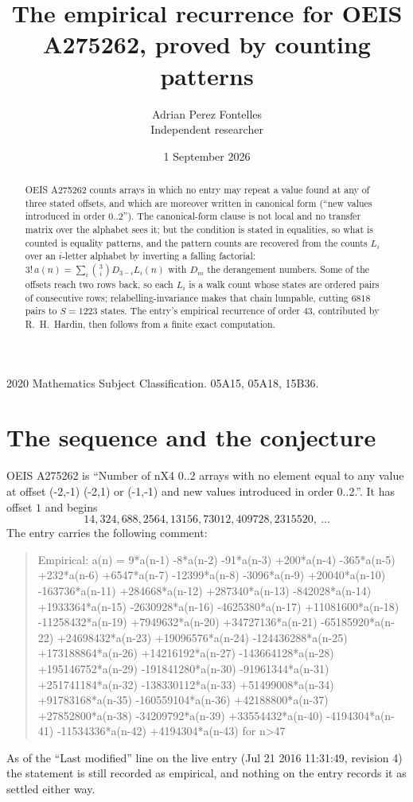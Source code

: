 \documentclass[11pt,a4paper]{article}
\title{The empirical recurrence for OEIS A275262, proved by counting patterns}
\author{Adrian Perez Fontelles\\ \small Independent researcher}
\date{1 September 2026}
\theoremstyle{plain}
\theoremstyle{definition}
\begin{document}
\maketitle

\begin{abstract}
OEIS A275262 counts arrays in which no entry may repeat a value found at any of three stated
offsets, and which are moreover written in canonical form (``new values introduced in order
$0..2$''). The canonical-form clause is not local and no transfer matrix over the
alphabet sees it; but the condition is stated in equalities, so what is counted is equality
patterns, and the pattern counts are recovered from the counts $L_i$ over an $i$-letter
alphabet by inverting a falling factorial:
$3!\,a(n)=\sum_i\binom{3}{i}D_{3-i}L_i(n)$ with $D_m$ the derangement numbers.
Some of the offsets reach two rows back, so each $L_i$ is a walk count whose states are
ordered pairs of consecutive rows; relabelling-invariance makes that chain lumpable,
cutting $6818$ pairs to $S=1223$ states. The entry's empirical recurrence of order $43$,
contributed by R.~H.~Hardin, then follows from a finite exact computation.
\end{abstract}

\noindent\small 2020 Mathematics Subject Classification. 05A15, 05A18, 15B36.\normalsize

\section{The sequence and the conjecture}

OEIS A275262 is ``Number of nX4 0..2 arrays with no element equal to any value at offset (-2,-1) (-2,1) or (-1,-1) and new values introduced in order 0..2.''. It has offset $1$ and begins
\[
14, 324, 688, 2564, 13156, 73012, 409728, 2315520,\ \dots
\]
The entry carries the following comment:
\begin{quote}\small
Empirical: a(n) = 9*a(n-1) -8*a(n-2) -91*a(n-3) +200*a(n-4) -365*a(n-5) +232*a(n-6) +6547*a(n-7) -12399*a(n-8) -3096*a(n-9) +20040*a(n-10) -163736*a(n-11) +284668*a(n-12) +287340*a(n-13) -842028*a(n-14) +1933364*a(n-15) -2630928*a(n-16) -4625380*a(n-17) +11081600*a(n-18) -11258432*a(n-19) +7949632*a(n-20) +34727136*a(n-21) -65185920*a(n-22) +24698432*a(n-23) +19096576*a(n-24) -124436288*a(n-25) +173188864*a(n-26) +14216192*a(n-27) -143664128*a(n-28) +195146752*a(n-29) -191841280*a(n-30) -91961344*a(n-31) +251741184*a(n-32) -138330112*a(n-33) +51499008*a(n-34) +91783168*a(n-35) -160559104*a(n-36) +42188800*a(n-37) +27852800*a(n-38) -34209792*a(n-39) +33554432*a(n-40) -4194304*a(n-41) -11534336*a(n-42) +4194304*a(n-43) for n>47
\end{quote}
As of the ``Last modified'' line on the live entry (Jul 21 2016 11:31:49, revision 4) the statement is
still recorded as empirical, and nothing on the entry records it as settled either way.
\end{document}
